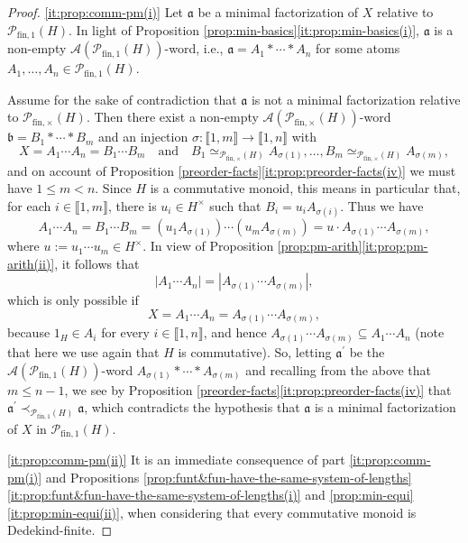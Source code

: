 \documentclass{report}
\renewcommand{\P}{\mathcal{P}}
\newcommand{\llb}{\llbracket}
\newcommand{\rrb}{\rrbracket}
\newcommand{\fin}{\textrm{fin}}
\renewcommand{\:}{\text{:}}
\theoremstyle{definition}
\begin{document}
\begin{proof}
	\ref{it:prop:comm-pm(i)} Let $\mathfrak{a}$ be a minimal factorization of $X$ relative to $\P_{\fin,1}(H)$. In light of Proposition \ref{prop:min-basics}\ref{it:prop:min-basics(i)}, $\mathfrak{a}$ is a non-empty $\mathscr A(\mathcal P_{\fin,1}(H))$-word, i.e., $\mathfrak a = A_1 \ast \cdots \ast A_n$ for some atoms $A_1, \ldots, A_n \in \mathcal P_{\fin,1}(H)$. 
	
	Assume for the sake of contradiction that $\mathfrak a$ is not a minimal factorization relative to $\P_{\fin,\times}(H)$. Then there exist a non-empty $\mathscr A(\mathcal P_{\fin,\times}(H))$-word $\mathfrak b = B_1 * \cdots * B_m$ and an injection $\sigma: \llb 1, m \rrb \to \llb 1, n \rrb$ with 
	\[
	X = A_1 \cdots A_n = B_1 \cdots B_m
	\quad\text{and}\quad
	B_1 \simeq_{\mathcal P_{\fin,\times}(H)} A_{\sigma(1)}, \ldots, B_m \simeq_{\mathcal P_{\fin,\times}(H)} A_{\sigma(m)},
	\]
	and on account of Proposition \ref{preorder-facts}\ref{it:prop:preorder-facts(iv)} we must have $1 \le m < n$.
	Since $H$ is a commutative monoid, this means in particular that, for each $i \in \llb 1, m \rrb$, there is $u_i \in H^\times$ such that $B_i = u_i A_{\sigma(i)}$. Thus we have
	\[
	A_1 \cdots A_n = B_1 \cdots B_m = (u_1 A_{\sigma(1)}) \cdots (u_m A_{\sigma(m)}) = u \cdot A_{\sigma(1)} \cdots A_{\sigma(m)},
	\]
	where $u := u_1 \cdots u_m \in H^\times$. In view of Proposition \ref{prop:pm-arith}\ref{it:prop:pm-arith(ii)}, it follows that
	\[
	\left| A_1 \cdots A_n \right| = \left|A_{\sigma(1)} \cdots A_{\sigma(m)} \right|,
	\]
	which is only possible if 
	\[
	X = A_1 \cdots A_n = A_{\sigma(1)} \cdots A_{\sigma(m)}, 
	\]
	because $1_H \in A_i$ for every $i \in \llb 1, n \rrb$, and hence $A_{\sigma(1)} \cdots A_{\sigma(m)} \subseteq A_1 \cdots A_n$ (note that here we use again that $H$ is commutative). So, letting $\mathfrak a^\prime$ be the $\mathscr A(\mathcal P_{\fin,1}(H))$-word $ A_{\sigma(1)} \ast \cdots \ast A_{\sigma(m)}$ and recalling from the above that $m \le n-1$, we see by Proposition \ref{preorder-facts}\ref{it:prop:preorder-facts(iv)} that $\mathfrak a^\prime \prec_{\mathcal P_{\fin,1}(H)} \mathfrak a$, which contradicts the hypothesis that $\mathfrak a$ is a minimal factorization of $X$ in $\mathcal P_{\fin,1}(H)$.
	
	\ref{it:prop:comm-pm(ii)} It is an immediate consequence of part \ref{it:prop:comm-pm(i)} and Propositions \ref{prop:funt&fun-have-the-same-system-of-lengths}\ref{it:prop:funt&fun-have-the-same-system-of-lengths(i)} and \ref{prop:min-equi}\ref{it:prop:min-equi(ii)}, when considering that every commutative monoid is Dedekind-finite.
	

\end{proof}
\end{document}
